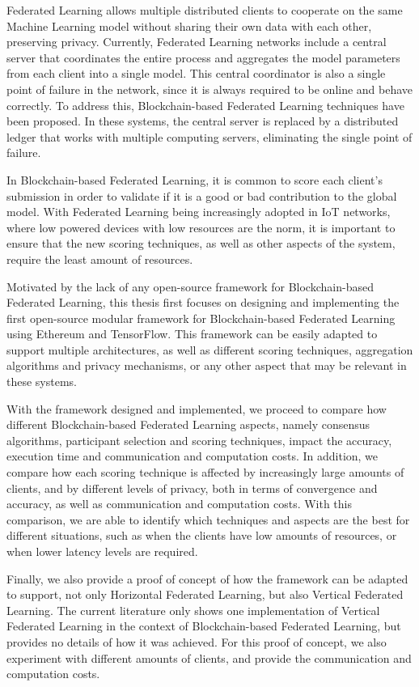 Federated Learning allows multiple distributed clients to cooperate on the same Machine Learning model without sharing their own data with each other, preserving privacy. Currently, Federated Learning networks include a central server that coordinates the entire process and aggregates the model parameters from each client into a single model. This central coordinator is also a single point of failure in the network, since it is always required to be online and behave correctly. To address this, Blockchain-based Federated Learning techniques have been proposed. In these systems, the central server is replaced by a distributed ledger that works with multiple computing servers, eliminating the single point of failure.

In Blockchain-based Federated Learning, it is common to score each client's submission in order to validate if it is a good or bad contribution to the global model. With Federated Learning being increasingly adopted in IoT networks, where low powered devices with low resources are the norm, it is important to ensure that the new scoring techniques, as well as other aspects of the system, require the least amount of resources.

Motivated by the lack of any open-source framework for Blockchain-based Federated Learning, this thesis first focuses on designing and implementing the first open-source modular framework for Blockchain-based Federated Learning using Ethereum and TensorFlow. This framework can be easily adapted to support multiple architectures, as well as different scoring techniques, aggregation algorithms and privacy mechanisms, or any other aspect that may be relevant in these systems.

With the framework designed and implemented, we proceed to compare how different Blockchain-based Federated Learning aspects, namely consensus algorithms, participant selection and scoring techniques, impact the accuracy, execution time and communication and computation costs. In addition, we compare how each scoring technique is affected by increasingly large amounts of clients, and by different levels of privacy, both in terms of convergence and accuracy, as well as communication and computation costs. With this comparison, we are able to identify which techniques and aspects are the best for different situations, such as when the clients have low amounts of resources, or when lower latency levels are required.

Finally, we also provide a proof of concept of how the framework can be adapted to support, not only Horizontal Federated Learning, but also Vertical Federated Learning. The current literature only shows one implementation of Vertical Federated Learning in the context of Blockchain-based Federated Learning, but provides no details of how it was achieved. For this proof of concept, we also experiment with different amounts of clients, and provide the communication and computation costs.
